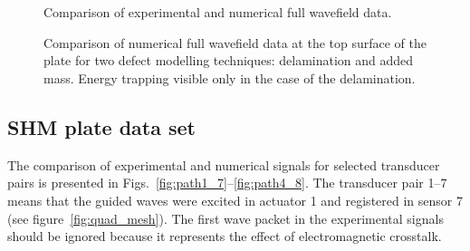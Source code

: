 \documentclass[12pt]{iopart}
\begin{document}
\begin{figure} [h!]
	\centering
   \hspace{0.5 cm} 	
   \\
   \hspace{0.5 cm} 	
   \\
   \hspace{0.5 cm} 	
	\caption{Comparison of experimental and numerical full wavefield data.} 
	\label{fig:wavefields_comparison}
\end{figure}

\begin{figure} [h!]
		\centering
		\hspace{0.5 cm} 	
	\caption{Comparison of numerical full wavefield data at the top surface of the plate for two defect modelling techniques: delamination and added mass. Energy trapping visible only in the case of the delamination.} 
	\label{fig:wave_entrapment}
\end{figure}
\clearpage

\subsection{SHM plate data set}

The comparison of experimental and numerical signals for selected transducer pairs is presented in Figs.~\ref{fig:path1_7}--\ref{fig:path4_8}. The transducer pair 1--7 means that the guided waves were excited in actuator 1 and registered in sensor 7 (see figure~\ref{fig:quad_mesh}). The first wave packet in the experimental signals should be ignored because it represents the effect of electromagnetic crosstalk.
\end{document}
